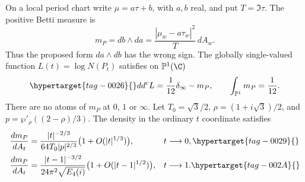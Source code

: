 \begin{proposition}\hypertarget{tag-001W}{}\label{ari:C.8.9}

On a local period chart write $\mu=a\tau+b$, with $a,b$ real,
and put $T=\Im\tau$. The positive Betti measure is
\[
 m_P=db\wedge da
 =\frac{|\mu_w-a\tau_w|^2}{T}\,dA_w.
\]
Thus the proposed form $da\wedge db$ has the wrong sign.
The globally single-valued function $L(t)=\log N(P_t)$ satisfies
on $\mathbb P^1(\C)$
\begin{equation}\hypertarget{tag-0026}{}\label{ari:eq:ca-current}
 dd^cL=\frac1{12}\delta_\infty-m_P,\qquad
               \int_{\mathbb P^1}m_P=\frac1{12}.
\end{equation}
There are no atoms of $m_P$ at $0$, $1$ or $\infty$.
Let $T_0=\sqrt3/2$, $\rho=(1+i\sqrt3)/2$, and
$p=\wp'_\rho((2-\rho)/3)$. The density in the ordinary
$t$ coordinate satisfies
\begin{align}
 \frac{dm_P}{dA_t}
 &=\frac{|t|^{-2/3}}{64T_0|p|^{2/3}}
                      \bigl(1+O(|t|^{1/3})\bigr),
                         &&t\longrightarrow0,\hypertarget{tag-0029}{}\label{ari:eq:ca-density0}\\
 \frac{dm_P}{dA_t}
 &=\frac{|t-1|^{-3/2}}{24\pi^2\sqrt{E_4(i)}}
                      \bigl(1+O(|t-1|^{1/2})\bigr),
                         &&t\longrightarrow1.\hypertarget{tag-002A}{}\label{ari:eq:ca-density1}
\end{align}
\end{proposition}


